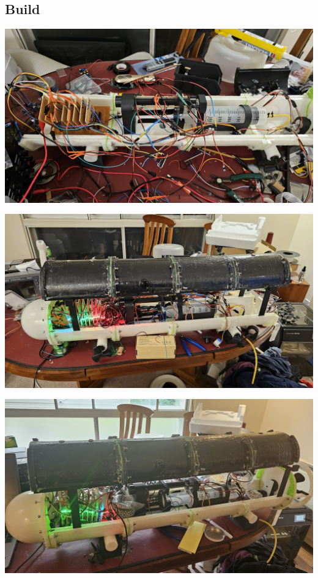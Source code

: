 \documentclass[11pt,a4paper,titlepage]{report}
\begin{document}
	\subsection{Build}\label{appendix:images_build}
	\begin{center}
		\label{picture:images_build_1}
		\includegraphics[width=\linewidth]{assets/AUV_Build1.jpg}
	\end{center}
	\begin{center}
		\label{picture:images_build_2}
		\includegraphics[width=\linewidth]{assets/AUV_Build2.jpg}
	\end{center}
	\begin{center}
		\label{picture:images_build_3}
		\includegraphics[width=\linewidth]{assets/AUV_Build3.jpg}
	\end{center}
\end{document}
